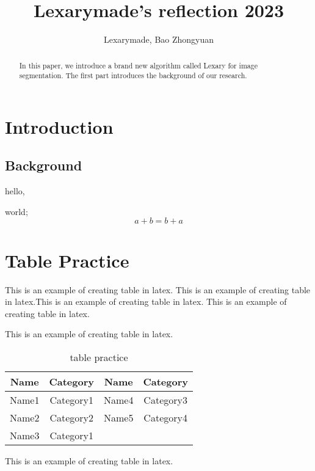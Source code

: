 \documentclass{article}
\title{\vspace{-4cm}Lexarymade's reflection 2023}
\date{}
\author{Lexarymade, Bao Zhongyuan}
\begin{document}
    \maketitle

       \begin{abstract}
        In this paper, we introduce a brand new algorithm
        called Lexary for image segmentation. The first part
        introduces the background of our research.
    \end{abstract}

    \section{Introduction}
        \subsection{Background}
            \hspace{1.5em}hello, \par world;
            \begin{equation}
                a + b = b  + a 
            \end{equation}

    \section{Table Practice}
    \hspace{1.5em}This is an example of creating table in latex.
    This is an example of creating table in latex.This is an example of creating table in latex.
    This is an example of creating table in latex.

    This is an example of creating table in latex.
    \begin{table}[h!]
        \renewcommand{\arraystretch}{1.3}
        \vspace{-1.5em}
        \centering
        \caption{table practice}
        \vspace{0.5mm}
        \begin{tabular}{cccc}
        \hline
        \textbf{Name} & \textbf{Category} & \textbf{Name} & \textbf{Category} \\ \hline
        Name1         & Category1         & Name4         & Category3         \\
        Name2         & Category2         & Name5         & Category4         \\
        Name3         & Category1         &               &                   \\ \hline
        \end{tabular}
        \vspace{-0.5em}
    \end{table}
    \par This is an example of creating table in latex.
\end{document}
